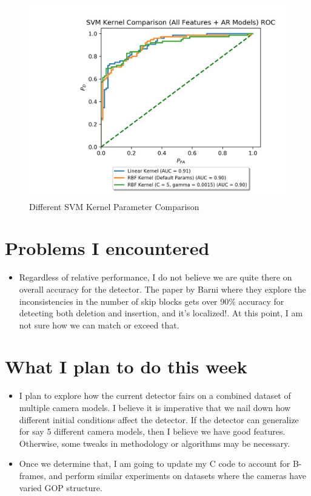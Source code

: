 \documentclass[12pt]{article}%
\def\bi{\begin{itemize}     %
\vspace{-0.5em}\setlength\itemsep{0em}}
\begin{document}
\begin{figure}[htbp]
\centerline{\includegraphics[width=0.9\linewidth]{../Graphs/SVM_kernel_comparison_roc.png}}
\caption{Different SVM Kernel Parameter Comparison}
\label{rbfcomp}
\end{figure}

\section{Problems I encountered}
\bi
\item Regardless of relative performance, I do not believe we are quite there on overall accuracy for the detector. The paper by Barni where they explore the inconsistencies in the number of skip blocks gets over 90\% accuracy for detecting both deletion and insertion, and it's localized!. At this point, I am not sure how we can match or exceed that.
\end{itemize}

\section{What I plan to do this week}
\bi
\item I plan to explore how the current detector fairs on a combined dataset of multiple camera models. I believe it is imperative that we nail down how different initial conditions affect the detector. If the detector can generalize for say 5 different camera models, then I believe we have good features. Otherwise, some tweaks in methodology or algorithms may be necessary.
\item Once we determine that, I am going to update my C code to account for B-frames, and perform similar experiments on datasets where the cameras have varied GOP structure.
\end{itemize}

\end{document}
